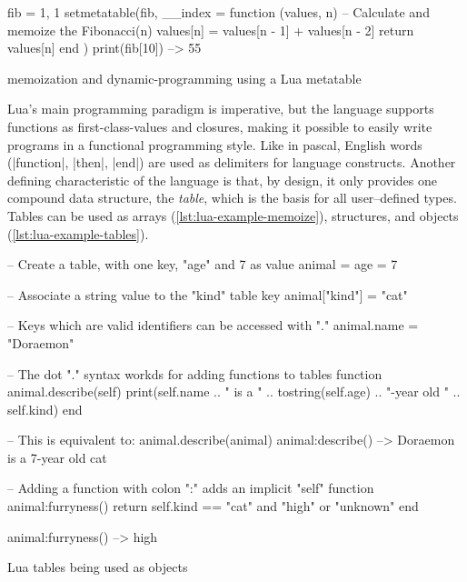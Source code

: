 \begin{listing}[htH]
  \begin{luacode}
    fib = { 1, 1 }
    setmetatable(fib, {
      __index = function (values, n)
        -- Calculate and memoize the Fibonacci(n)
        values[n] = values[n - 1] + values[n - 2]
        return values[n]
      end
    })
    print(fib[10])  --> 55
  \end{luacode}
  \caption{\Gls{memoization} and \gls{dynamic-programming} using a Lua metatable}
	\label{lst:lua-example-memoize}
\end{listing}

Lua's main programming paradigm is imperative, but the language supports
functions as \glspl{first-class-value} and \glspl{closure}, making it possible
to easily write programs in a functional programming style. Like in
\gls{pascal}, English words (\Mlua|function|, \Mlua|then|, \Mlua|end|) are
used as delimiters for language constructs. Another defining characteristic of
the language is that, by design, it only provides one compound data structure,
the \emph{table}, which is the basis for all user--defined types. Tables can
be used as arrays (\autoref{lst:lua-example-memoize}), structures, and
objects (\autoref{lst:lua-example-tables}).

\begin{listing}[htH]
  \begin{luacode}
    -- Create a table, with one key, "age" and 7 as value
    animal = { age = 7 }

    -- Associate a string value to the "kind" table key
    animal["kind"] = "cat"

    -- Keys which are valid identifiers can be accessed with "."
    animal.name = "Doraemon"

    -- The dot "." syntax workds for adding functions to tables
    function animal.describe(self)
      print(self.name .. " is a " .. tostring(self.age) ..
            "-year old " .. self.kind)
    end

    -- This is equivalent to: animal.describe(animal)
    animal:describe()  --> Doraemon is a 7-year old cat

    -- Adding a function with colon ":" adds an implicit "self"
    function animal:furryness()
      return self.kind == "cat" and "high" or "unknown"
    end

    animal:furryness()  --> high
  \end{luacode}
	\caption{Lua tables being used as objects}
  \label{lst:lua-example-tables}
\end{listing}


